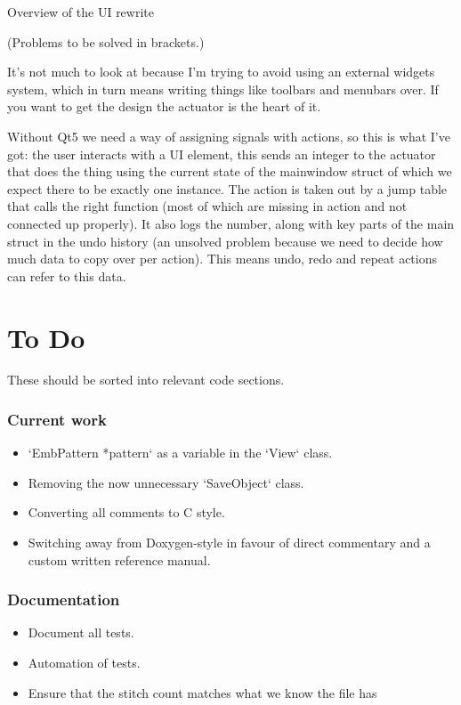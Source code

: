 \documentclass[a4paper]{report}
\begin{document}
Overview of the UI rewrite

(Problems to be solved in brackets.)

It's not much to look at because I'm trying to avoid using an external
widgets system, which in turn means writing things like toolbars and menubars
over. If you want to get the design the actuator is the heart of it.

Without Qt5 we need a way of assigning signals with actions, so this is what
I've got: the user interacts with a UI element, this sends an integer to the
actuator that does the thing using the current state of the mainwindow struct
of which we expect there to be exactly one instance. The action is taken out
by a jump table that calls the right function (most of which are missing in
action and not connected up properly). It also logs the number, along with
key parts of the main struct in the undo history (an unsolved problem because
we need to decide how much data to copy over per action). This means undo,
redo and repeat actions can refer to this data.

\chapter{To Do}

These should be sorted into relevant code sections.

\subsection{Current work}

\begin{itemize}
\item `EmbPattern *pattern` as a variable in the `View` class.
\item Removing the now unnecessary `SaveObject` class.
\item Converting all comments to C style.
\item Switching away from Doxygen-style in favour of direct commentary and a custom written reference manual.
\end{itemize}

\subsection{Documentation}

\begin{itemize}
\item Document all tests.
\item Automation of tests.
\item Ensure that the stitch count matches what we know the file has
\end{itemize}
\end{document}
